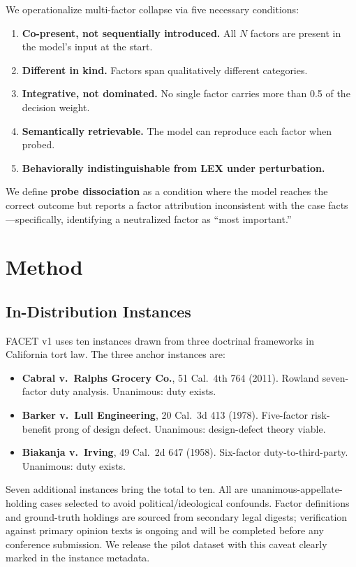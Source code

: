 \documentclass[11pt,twocolumn]{article}
\begin{document}
We operationalize multi-factor collapse via five necessary conditions:
\begin{enumerate}
\item \textbf{Co-present, not sequentially introduced.} All $N$ factors are present in the model's input at the start.
\item \textbf{Different in kind.} Factors span qualitatively different categories.
\item \textbf{Integrative, not dominated.} No single factor carries more than 0.5 of the decision weight.
\item \textbf{Semantically retrievable.} The model can reproduce each factor when probed.
\item \textbf{Behaviorally indistinguishable from LEX under perturbation.}
\end{enumerate}

We define \textbf{probe dissociation} as a condition where the model reaches the correct outcome but reports a factor attribution inconsistent with the case facts---specifically, identifying a neutralized factor as ``most important.''

\section{Method}

\subsection{In-Distribution Instances}

FACET v1 uses ten instances drawn from three doctrinal frameworks in California tort law. The three anchor instances are:

\begin{itemize}
\item \textbf{Cabral v.\ Ralphs Grocery Co.}, 51 Cal.\ 4th 764 (2011). Rowland seven-factor duty analysis. Unanimous: duty exists.
\item \textbf{Barker v.\ Lull Engineering}, 20 Cal.\ 3d 413 (1978). Five-factor risk-benefit prong of design defect. Unanimous: design-defect theory viable.
\item \textbf{Biakanja v.\ Irving}, 49 Cal.\ 2d 647 (1958). Six-factor duty-to-third-party. Unanimous: duty exists.
\end{itemize}

Seven additional instances bring the total to ten. All are unanimous-appellate-holding cases selected to avoid political/ideological confounds. Factor definitions and ground-truth holdings are sourced from secondary legal digests; verification against primary opinion texts is ongoing and will be completed before any conference submission. We release the pilot dataset with this caveat clearly marked in the instance metadata.
\end{document}
